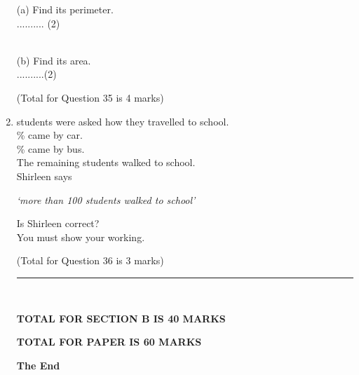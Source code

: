 \documentclass{article}
\begin{document}
\begin{enumerate}
\quad (a) Find its perimeter.
\vspace{170pt} \\
\hspace{15cm} .......... (2)  
\vspace{5pt}

\\
\quad (b) Find its area. 
\vspace{180pt} \\
\hspace{15cm} ..........(2)  
\vspace{5pt}

\hfill\raggedright (Total for Question 35 is 4 marks) 
\vspace{5pt}
\hline
\vspace{7pt}

\item {} students were asked how they travelled to school. \\
\% came by car. \\ 
\% came by bus. \\
\quad The remaining students walked to school. \\

\vspace{10pt}
\quad Shirleen says
\begin{center}
\textit{‘more than 100 students walked to school’}
\end{center}
\vspace{10pt}

\quad Is Shirleen correct? \\
\quad You must show your working.

\vspace{200pt} 

\hfill\raggedright (Total for Question 36 is 3 marks) 
\vspace{5pt}
\hline
\vspace{7pt}

\vspace{5pt}
\rule{\linewidth}{2pt} \\ 
\hfill\raggedright \textbf{TOTAL FOR SECTION B IS 40 MARKS}  \\
\hfill\raggedright \textbf{TOTAL FOR PAPER IS 60 MARKS} \\
\vspace{90pt}


\hspace{8cm} \textbf{The End}


\end{enumerate}
\end{document}
